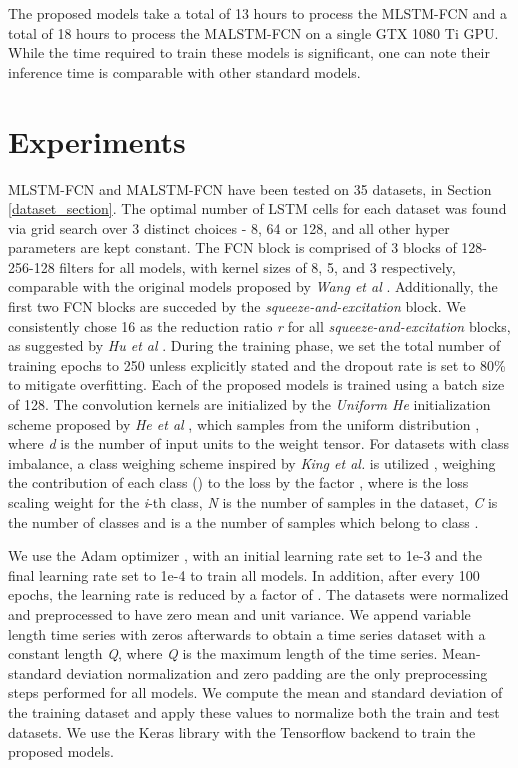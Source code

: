 \documentclass[preprint,12pt,3p]{elsarticle}
\begin{document}
The proposed models take a total of 13 hours to process the MLSTM-FCN and a total of 18 hours to process the MALSTM-FCN on a single GTX 1080 Ti GPU. While the time required to train these models is significant, one can note their inference time is comparable with other standard models.








%
 


\section{Experiments}
\label{Experiments}
MLSTM-FCN and MALSTM-FCN have been tested on 35 datasets, in Section \ref{dataset_section}. The optimal number of LSTM cells for each dataset was found via grid search over 3 distinct choices - 8, 64 or 128, and all other hyper parameters are kept constant. The FCN block is comprised of 3 blocks of 128-256-128 filters for all models, with kernel sizes of 8, 5, and 3 respectively, comparable with the original models proposed by \textit{Wang et al} \cite{wang2017time}. Additionally, the first two FCN blocks are succeded by the \textit{squeeze-and-excitation} block. We consistently chose 16 as the reduction ratio \textit{r} for all \textit{squeeze-and-excitation} blocks, as suggested by \textit{Hu et al} \cite{hu2017squeeze}. During the training phase, we set the total number of training epochs to 250 unless explicitly stated and the dropout rate is set to 80\% to mitigate overfitting. Each of the proposed models is trained using a batch size of 128. The convolution kernels are initialized by the \textit{Uniform He} initialization scheme proposed by \textit{He et al} \cite{he2015delving}, which samples from the uniform distribution , where \textit{d} is the number of input units to the weight tensor.  For datasets with class imbalance, a class weighing scheme inspired by \textit{King et al.} is utilized \cite{king2001logistic}, weighing the contribution of each class  () to the loss by the factor , where  is the loss scaling weight for the \textit{i}-th class, \textit{N} is the number of samples in the dataset, \textit{C} is the number of classes and  is a the number of samples which belong to class . 

We use the Adam optimizer \cite{kingma2014adam}, with an initial learning rate set to 1e-3 and the final learning rate set to 1e-4 to train all models. In addition, after every 100 epochs, the learning rate is reduced by a factor of . The datasets were normalized and preprocessed to have zero mean and unit variance. We append variable length time series with zeros afterwards to obtain a time series dataset with a constant length \textit{Q}, where \textit{Q} is the maximum length of the time series. Mean-standard deviation normalization and zero padding are the only preprocessing steps performed for all models. We compute the mean and standard deviation of the training dataset and apply these values to normalize both the train and test datasets. We use the Keras \cite{chollet2015keras} library with the Tensorflow backend \cite{tensorflow2015-whitepaper} to train the proposed models. 
\end{document}
